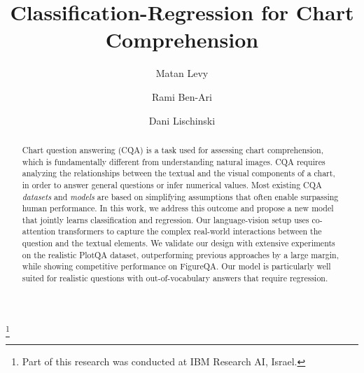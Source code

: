 \documentclass[runningheads]{llncs}
\newcommand\blfootnote[1]{\begingroup
  \renewcommand\thefootnote{}\footnote{#1}\addtocounter{footnote}{-1}\endgroup
}
\begin{document}
\pagestyle{headings}
\mainmatter
\def\ECCVSubNumber{5040}  

\title{Classification-Regression for Chart Comprehension} 

\begin{comment}
\titlerunning{ECCV-22 submission ID \ECCVSubNumber} 
\authorrunning{ECCV-22 submission ID \ECCVSubNumber} 
\author{Anonymous ECCV submission}
\institute{Paper ID \ECCVSubNumber}
\end{comment}


\author{Matan Levy \and
Rami Ben-Ari \and
Dani Lischinski}
\maketitle

\begin{abstract}
   Chart question answering (CQA) is a task used for assessing chart comprehension, which is fundamentally different from understanding natural images. CQA requires analyzing the relationships between the textual and the visual components of a chart, in order to answer general questions or infer numerical values. Most existing CQA {\it datasets} and {\it models} are based on simplifying assumptions that often enable surpassing human performance. In this work, we address this outcome and propose a new model that jointly learns classification and regression. Our language-vision setup uses co-attention transformers to capture the complex real-world interactions between the question and the textual elements. We validate our design with extensive experiments on the realistic PlotQA dataset, outperforming previous approaches by a large margin, while showing competitive performance on FigureQA. Our model is particularly well suited for realistic questions with out-of-vocabulary answers that require regression.
 \end{abstract}

\blfootnote{Part of this research was conducted at IBM Research AI, Israel.}
\end{document}
